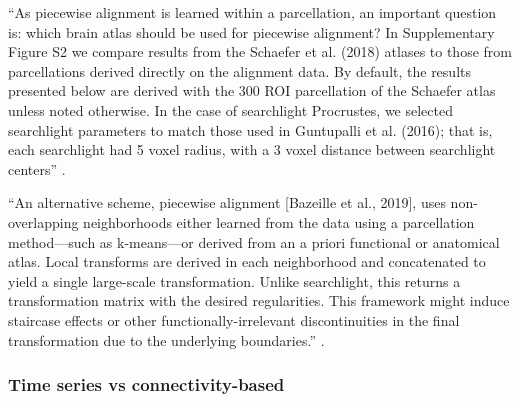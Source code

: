 %
``As piecewise alignment is learned within a parcellation, an important question
is:
%
which brain atlas should be used for piecewise alignment? In Supplementary
Figure S2 we compare results from the Schaefer et al. (2018) atlases to those
from parcellations derived directly on the alignment data.
%
By default, the results presented below are derived with the 300 ROI
parcellation of the Schaefer atlas unless noted otherwise.
%
In the case of searchlight Procrustes, we selected searchlight parameters to
match those used in Guntupalli et al. (2016);
%
that is, each searchlight had 5 voxel radius, with a 3 voxel distance between
searchlight centers'' \citep{bazeille2021empirical}.

``An alternative scheme, piecewise alignment [Bazeille et al., 2019], uses
non-overlapping neighborhoods either learned from the data using a parcellation
method—such as k-means—or derived from an a priori functional or anatomical
atlas.
%
Local transforms are derived in each neighborhood and concatenated to yield a
single large-scale transformation.
%
Unlike searchlight, this returns a transformation matrix with the desired
regularities.
%
This framework might induce staircase effects or other functionally-irrelevant
discontinuities in the final transformation due to the underlying boundaries.''
\citep{bazeille2021empirical}.


\subsubsection{Time series vs connectivity-based}






